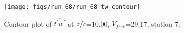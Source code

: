\begin{figure}[H]
\centering
\texttt{[image: figs/run\_68/run\_68\_tw\_contour]}
\caption{Contour plot of $\overline{t^\prime w^\prime}$ at $z/c$=10.00, $V_{free}$=29.17, station 7.}
\end{figure}


